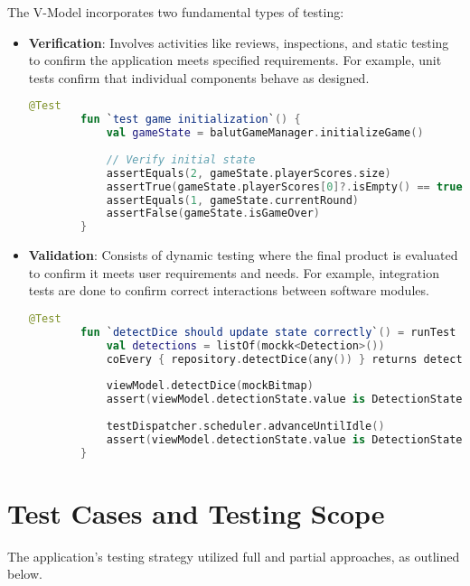 The V-Model incorporates two fundamental types of testing:
\begin{itemize}
    \item \textbf{Verification}: Involves activities like reviews, inspections, and static testing to confirm the application meets specified requirements. For example, unit tests confirm that individual components behave as designed.
    \begin{lstlisting}[language=Kotlin, caption=Unit Test for Game Initialization, label=lst:unit_game_init]
        @Test
        fun `test game initialization`() {
            val gameState = balutGameManager.initializeGame()
                
            // Verify initial state
            assertEquals(2, gameState.playerScores.size)
            assertTrue(gameState.playerScores[0]?.isEmpty() == true)
            assertEquals(1, gameState.currentRound)
            assertFalse(gameState.isGameOver)
        }
    \end{lstlisting}
    \item \textbf{Validation}: Consists of dynamic testing where the final product is evaluated to confirm it meets user requirements and needs. For example, integration tests are done to confirm correct interactions between software modules.
    \begin{lstlisting}[language=Kotlin, caption=Integration Test for Dice Detection, label=lst:integration_dice_detection]
        @Test
        fun `detectDice should update state correctly`() = runTest {
            val detections = listOf(mockk<Detection>())
            coEvery { repository.detectDice(any()) } returns detections
                
            viewModel.detectDice(mockBitmap)
            assert(viewModel.detectionState.value is DetectionState.Processing)
                
            testDispatcher.scheduler.advanceUntilIdle()
            assert(viewModel.detectionState.value is DetectionState.Success)
        } 
    \end{lstlisting}
\end{itemize}


\section{Test Cases and Testing Scope}

The application's testing strategy utilized full and partial approaches, as outlined below.

